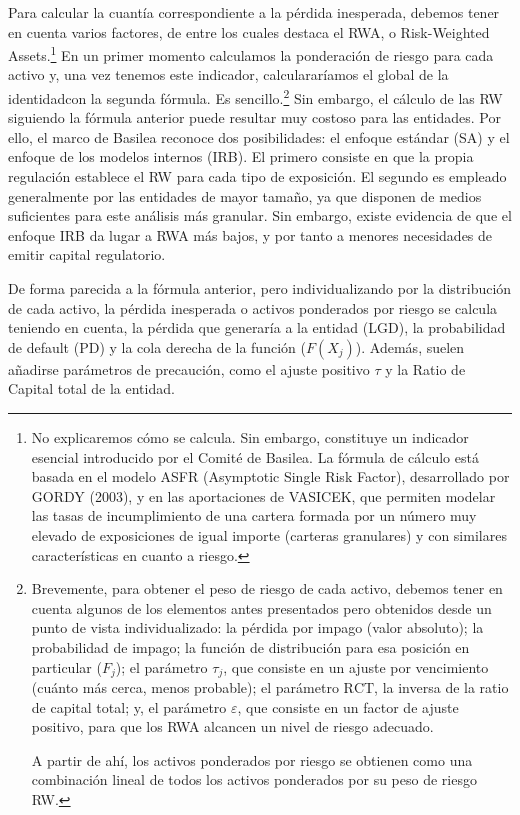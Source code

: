 \documentclass[10pt,a4paper]{article}
\begin{document}
Para calcular la cuantía correspondiente a la pérdida inesperada, debemos tener en cuenta varios factores, de entre los cuales destaca el RWA, o Risk-Weighted Assets.\footnote{%
    No explicaremos cómo se calcula. Sin embargo, constituye un indicador esencial introducido por el Comité de Basilea. La fórmula de cálculo está basada en el modelo ASFR (Asymptotic Single Risk Factor), desarrollado por GORDY (2003), y en las aportaciones de VASICEK, que permiten modelar las tasas de incumplimiento de una cartera formada por un número muy elevado de exposiciones de igual importe (carteras granulares) y con similares características en cuanto a riesgo.
} En un primer momento calculamos la ponderación de riesgo para cada activo y, una vez tenemos este indicador, calculararíamos el global de la identidadcon la segunda fórmula. Es sencillo.\footnote{
Brevemente, para obtener el peso de riesgo de cada activo, debemos tener en cuenta algunos de los elementos antes presentados pero obtenidos desde un punto de vista individualizado: la pérdida por impago (valor absoluto); la probabilidad de impago; la función de distribución para esa posición en particular ($F_j$); el parámetro $\tau_j$, que consiste en un ajuste por vencimiento (cuánto más cerca, menos probable); el parámetro $\text{RCT}$, la inversa de la ratio de capital total; y, el parámetro $\varepsilon$, que consiste en un factor de ajuste positivo, para que los RWA alcancen un nivel de riesgo adecuado.

A partir de ahí, los activos ponderados por riesgo se obtienen como una combinación lineal de todos los activos ponderados por su peso de riesgo RW.
} Sin embargo, el cálculo de las RW siguiendo la fórmula anterior puede resultar muy costoso para las entidades. Por ello, el marco de Basilea reconoce dos posibilidades: el enfoque estándar (SA) y el enfoque de los modelos internos (IRB). El primero consiste en que la propia regulación establece el RW para cada tipo de exposición. El segundo es empleado generalmente por las entidades de mayor tamaño, ya que disponen de medios suficientes para este análisis más granular. Sin embargo, existe evidencia de que el enfoque IRB da lugar a RWA más bajos, y por tanto a menores necesidades de emitir capital regulatorio.

De forma parecida a la fórmula anterior, pero individualizando por la distribución de cada activo, la pérdida inesperada o activos ponderados por riesgo se calcula teniendo en cuenta, la pérdida que generaría a la entidad (LGD), la probabilidad de default (PD) y la cola derecha de la función ($F(X_j)$). Además, suelen añadirse parámetros de precaución, como el ajuste positivo $\tau$ y la Ratio de Capital total de la entidad. 
\end{document}
